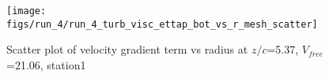 \begin{figure}[H]
\centering
\texttt{[image: figs/run\_4/run\_4\_turb\_visc\_ettap\_bot\_vs\_r\_mesh\_scatter]}
\caption{Scatter plot of velocity gradient term vs radius at $z/c$=5.37, $V_{free}$=21.06, station1}
\label{fig:run_4_turb_visc_ettap_bot_vs_r_mesh_scatter}
\end{figure}


